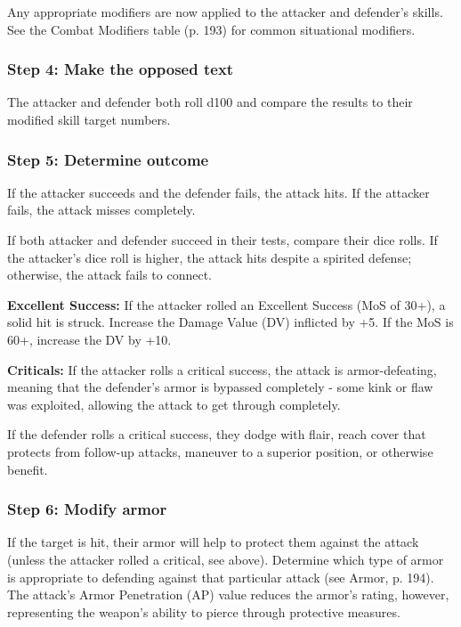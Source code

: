 Any appropriate modifiers are now applied to the attacker and defender’s skills. See the Combat Modifiers table (p. 193) for common situational modifiers.

\subsubsection{Step 4: Make the opposed text}

The attacker and defender both roll d100 and compare the results to their modified skill target numbers.

\subsubsection{Step 5: Determine outcome}

If the attacker succeeds and the defender fails, the attack hits. If the attacker fails, the attack misses completely.

If both attacker and defender succeed in their tests, compare their dice rolls. If the attacker’s dice roll is higher, the attack hits despite a spirited defense; otherwise, the attack fails to connect.

\textbf{Excellent Success:} If the attacker rolled an Excellent Success (MoS of 30+), a solid hit is struck. Increase the Damage Value (DV) inflicted by +5. If the MoS is 60+, increase the DV by +10.

\textbf{Criticals:} If the attacker rolls a critical success, the attack is armor-defeating, meaning that the defender’s armor is bypassed completely  -  some kink or flaw was exploited, allowing the attack to get through completely.

If the defender rolls a critical success, they dodge with flair, reach cover that protects from follow-up attacks, maneuver to a superior position, or otherwise benefit.

\subsubsection{Step 6: Modify armor}

If the target is hit, their armor will help to protect them against the attack (unless the attacker rolled a critical, see above). Determine which type of armor is appropriate to defending against that particular attack (see Armor, p. 194). The attack’s Armor Penetration (AP) value reduces the armor’s rating, however, representing the weapon’s ability to pierce through protective measures.


